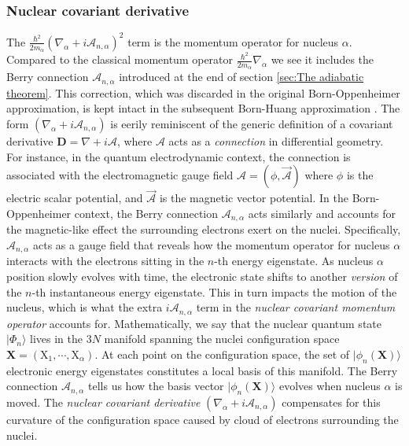\documentclass[11pt,a4paper]{article}
\begin{document}
\subsubsection{Nuclear covariant derivative}
The $\frac{\hbar^2}{2m_\alpha} (\nabla_\alpha + i\boldsymbol{\mathcal{A}}_{n,\alpha})^2$ term is the momentum operator for nucleus $\alpha$. Compared to the classical momentum operator $\frac{\hbar^2}{2m_\alpha}\nabla_\alpha$ we see it includes the Berry connection $\boldsymbol{\mathcal{A}}_{n,\alpha}$ introduced at the end of section \ref{sec:The adiabatic theorem}. This correction, which was discarded in the original Born-Oppenheimer approximation, is kept intact in the subsequent Born-Huang approximation \cite{BornHuang1954}. The form $(\nabla_\alpha + i\boldsymbol{\mathcal{A}}_{n,\alpha})$ is eerily reminiscent of the generic definition of a covariant derivative $\boldsymbol{D} = \nabla + i\boldsymbol{\mathcal{A}}$, where $\boldsymbol{\mathcal{A}}$ acts as a \emph{connection} in differential geometry. For instance, in the quantum electrodynamic context, the connection is associated with the electromagnetic gauge field $\boldsymbol{\mathcal{A}} = (\phi,\vec{\mathcal{A}})$ where $\phi$ is the electric scalar potential, and $\vec{\mathcal{A}}$ is the magnetic vector potential. In the Born-Oppenheimer context, the Berry connection $\boldsymbol{\mathcal{A}}_{n,\alpha}$ acts similarly and accounts for the magnetic-like effect the surrounding electrons exert on the nuclei. Specifically, $\boldsymbol{\mathcal{A}}_{n,\alpha}$ acts as a gauge field that reveals how the momentum operator for nucleus $\alpha$ interacts with the electrons sitting in the $n$-th energy eigenstate. As nucleus $\alpha$ position slowly evolves with time, the electronic state shifts to another \emph{version} of the $n$-th instantaneous energy eigenstate. This in turn impacts the motion of the nucleus, which is what the extra $i\boldsymbol{\mathcal{A}}_{n,\alpha}$ term in the \emph{nuclear covariant momentum operator} accounts for. Mathematically, we say that the nuclear quantum state $|\Phi_n\rangle$ lives in the $3N$ manifold spanning the nuclei configuration space $\mathbf{X}=(\mathrm{X}_1,\cdots,\mathrm{X}_\alpha)$. At each point on the configuration space, the set of $|\phi_n(\mathbf{X})\rangle$ electronic energy eigenstates constitutes a local basis of this manifold. The Berry connection $\boldsymbol{\mathcal{A}}_{n,\alpha}$ tells us how the basis vector $|\phi_n(\mathbf{X})\rangle$ evolves when nucleus $\alpha$ is moved. The \emph{nuclear covariant derivative} $(\nabla_\alpha + i\boldsymbol{\mathcal{A}}_{n,\alpha})$ compensates for this curvature of the configuration space caused by cloud of electrons surrounding the nuclei.
\end{document}
